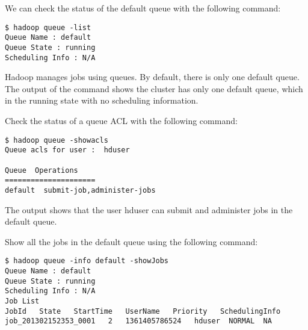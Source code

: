 We can check the status of the default queue with the following command:
\begin{verbatim}
$ hadoop queue -list
Queue Name : default
Queue State : running
Scheduling Info : N/A
\end{verbatim}

Hadoop manages jobs using queues. By default, there is only one default queue. The output of the command shows the cluster has only one default queue, which in the running state with no scheduling information.

Check the status of a queue ACL with the following command: 
\begin{verbatim}
$ hadoop queue -showacls
Queue acls for user :  hduser

Queue  Operations
=====================
default  submit-job,administer-jobs
\end{verbatim}

The output shows that the user hduser can submit and administer jobs in the default queue.

Show all the jobs in the default queue using the following command:
\begin{verbatim}
$ hadoop queue -info default -showJobs
Queue Name : default
Queue State : running
Scheduling Info : N/A
Job List
JobId   State   StartTime   UserName   Priority   SchedulingInfo
job_201302152353_0001   2   1361405786524   hduser  NORMAL  NA
\end{verbatim}

